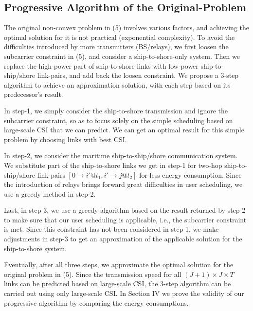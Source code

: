 \documentclass[journal]{IEEEtran}
\begin{document}
 
 \subsection{Progressive Algorithm of the Original-Problem}
 
 The original non-convex problem in (5) involves various factors, and achieving the optimal solution for it is not practical (exponential complexity). To avoid the difficulties introduced by more transmitters (BS/relays), we first loosen the subcarrier constraint in (5), and consider a ship-to-shore-only system. Then we replace the high-power part of ship-to-shore links with low-power ship-to-ship/shore link-pairs, and add back the loosen constraint. We propose a 3-step algorithm to achieve an approximation solution, with each step based on its predecessor's result. 
 
 In step-1, we simply consider the ship-to-shore transmission and ignore the subcarrier constraint, so as to focus solely on the simple scheduling based on large-scale CSI that we can predict. 
 We can get an optimal result for this simple problem by choosing links with best CSI. 
 
 In step-2, we consider the maritime ship-to-ship/shore communication system. We substitute part of the ship-to-shore links we get in step-1 for two-hop ship-to-ship/shore link-pairs $\left[ {0 \to i'@{t_1},i' \to j@{t_2}} \right]$ for less energy consumption. Since the introduction of relays brings forward great difficulties in user scheduling, we use a greedy method in step-2. %
 
 Last, in step-3, we use a greedy algorithm based on the result returned by step-2 to make sure that our user scheduling is applicable, i.e., the subcarrier constraint is met. Since this constraint has not been considered in step-1, we make adjustments in step-3 to get an approximation of the applicable solution for the ship-to-shore system. 

 Eventually, after all three steps, we approximate the optimal solution for the original problem in (5). Since the transmission speed for all $\left( J+1 \right) \times J \times T$ links can be predicted based on large-scale CSI, the 3-step algorithm can be carried out using only large-scale CSI. In Section IV we prove the validity of our progressive algorithm by comparing the energy consumptions. 
 
\end{document}
